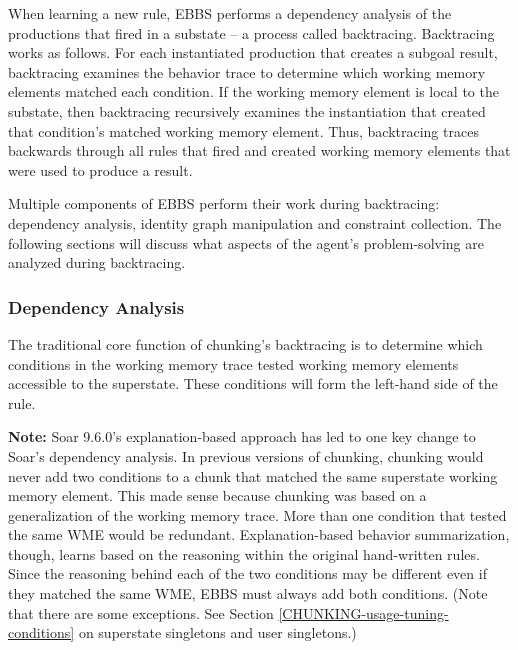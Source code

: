 When learning a new rule, EBBS performs a dependency analysis of the productions that fired in a substate -- a process called backtracing. Backtracing works as follows.  For each instantiated production that creates a subgoal result, backtracing examines the behavior trace to determine which working memory elements matched each condition. If the working memory element is local to the substate, then backtracing recursively examines the instantiation that created that condition's matched working memory element. Thus, backtracing traces backwards through all rules that fired and created working memory elements that were used to produce a result.


Multiple components of EBBS perform their work during backtracing:  dependency analysis, identity graph manipulation and constraint collection.  The following sections will discuss what aspects of the agent's problem-solving are analyzed during backtracing.

\subsubsection{Dependency Analysis}
\label{CHUNKING-during-backtracing-operationality}

The traditional core function of chunking's backtracing is to determine which conditions in the working memory trace tested working memory elements accessible to the superstate.  These conditions will form the left-hand side of the rule.

\textbf{Note:} Soar 9.6.0's explanation-based approach has led to one key change to Soar's dependency analysis.  In previous versions of chunking, chunking would never add two conditions to a chunk that matched the same superstate working memory element.  This made sense because chunking was based on a generalization of the working memory trace.  More than one condition that tested the same WME would be redundant.  Explanation-based behavior summarization, though, learns based on the reasoning within the original hand-written rules.  Since the reasoning behind each of the two conditions may be different even if they matched the same WME, EBBS must always add both conditions.  (Note that there are some exceptions. See Section \ref{CHUNKING-usage-tuning-conditions} on superstate singletons and user singletons.)

